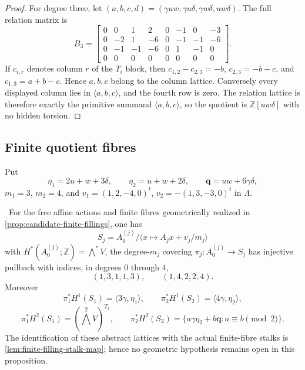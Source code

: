 \begin{proof}
For degree three, let
$(a,b,c,d)=(\gamma uw,\gamma u\delta,\gamma w\delta,uw\delta)$.
The full relation matrix is
\[
B_3=
\left[
\begin{array}{rrrr|rrrr}
0&0&1&2&0&-1&0&-3\\
0&-2&1&-6&0&-1&-1&-6\\
0&-1&-1&-6&0&1&-1&0\\
0&0&0&0&0&0&0&0
\end{array}
\right].
\tag{3.6b}
\]
If $c_{i,r}$ denotes column $r$ of the $T_i$ block, then
$c_{1,2}-c_{2,3}=-b$, $c_{2,3}=-b-c$, and
$c_{1,3}=a+b-c$.  Hence $a,b,c$ belong to the column lattice.
Conversely every displayed column lies in $\langle a,b,c\rangle$, and the
fourth row is zero.  The relation lattice is therefore exactly the primitive
summand $\langle a,b,c\rangle$, so the quotient is
$\mathbb Z[uw\delta]$ with no hidden torsion.
\end{proof}

\subsection{Finite quotient fibres}

Put
\[
\eta_1=2u+w+3\delta,\qquad
\eta_2=u+w+2\delta,\qquad
\mathbf q=uw+6\gamma\delta,
\]
$m_1=3$, $m_2=4$, and
$v_1=(1,2,-4,0)^t$, $v_2=-(1,3,-3,0)^t$ in $\Lambda$.

\begin{proposition}
\label{prop:finite-indices}
\Verified\ For the free affine actions and finite fibres geometrically
realized in \cref{prop:candidate-finite-fillings}, one has
\[
S_j=A_0^{(j)}/\langle x\mapsto A_jx+v_j/m_j\rangle
\]
with $H^*(A_0^{(j)};\mathbb Z)=\bigwedge^*V$, the
degree-$m_j$ covering $\pi_j:A_0^{(j)}\to S_j$ has injective pullback with
indices, in degrees $0$ through $4$,
\[
(1,3,1,1,3),\qquad (1,4,2,2,4).
\tag{3.7}
\]
Moreover
\[
\pi_1^*H^1(S_1)=\langle3\gamma,\eta_1\rangle,\qquad
\pi_2^*H^1(S_2)=\langle4\gamma,\eta_2\rangle,
\]
\[
\pi_1^*H^2(S_1)=(\textstyle\bigwedge^2V)^{T_1},\qquad
\pi_2^*H^2(S_2)
=\{a\gamma\eta_2+b\mathbf q:a\equiv b\pmod2\}.
\tag{3.8}
\]
The identification of these abstract lattices with the actual finite-fibre
stalks is \cref{lem:finite-filling-stalk-map}; hence no geometric hypothesis
remains open in this proposition.
\end{proposition}

